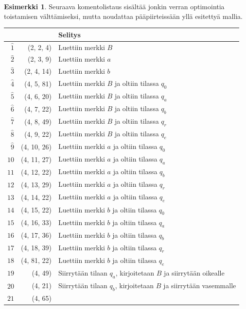 \documentclass[a4paper, 12pt]{article}
\theoremstyle{definition}
\newtheorem{example}[mydef]{Esimerkki}
\theoremstyle{plain}
\begin{document}
\begin{example}
Seuraava komentolistaus sisältää jonkin verran optimointia toistamisen välttämiseksi, mutta noudattaa pääpiirteissään yllä esitettyä mallia.
\\
\begin{center}
\begin{tabular}[t]{r|r|l}
& & Selitys\\
\hline
$\hat{1}$ & (2, 2, 4) & Luettiin merkki $B$ \\
$\hat{2}$ & (2, 3, 9) & Luettiin merkki $a$ \\
$\hat{3}$ & (2, 4, 14) & Luettiin merkki $b$ \\
$\hat{4}$ & (4, 5, 81) & Luettiin merkki $B$ ja oltiin tilassa $q_0$ \\
$\hat{5}$ & (4, 6, 20) & Luettiin merkki $B$ ja oltiin tilassa $q_a$ \\
$\hat{6}$ & (4, 7, 22) & Luettiin merkki $B$ ja oltiin tilassa $q_b$ \\
$\hat{7}$ & (4, 8, 49) & Luettiin merkki $B$ ja oltiin tilassa $q_r$ \\
$\hat{8}$ & (4, 9, 22) & Luettiin merkki $B$ ja oltiin tilassa $q_e$ \\
$\hat{9}$ & (4, 10, 26) & Luettiin merkki $a$ ja oltiin tilassa $q_0$ \\
$\hat{10}$ & (4, 11, 27) & Luettiin merkki $a$ ja oltiin tilassa $q_a$ \\
$\hat{11}$ & (4, 12, 22) & Luettiin merkki $a$ ja oltiin tilassa $q_b$ \\
$\hat{12}$ & (4, 13, 29) & Luettiin merkki $a$ ja oltiin tilassa $q_r$ \\
$\hat{13}$ & (4, 14, 22) & Luettiin merkki $a$ ja oltiin tilassa $q_e$ \\
$\hat{14}$ & (4, 15, 22) & Luettiin merkki $b$ ja oltiin tilassa $q_0$ \\
$\hat{15}$ & (4, 16, 33) & Luettiin merkki $b$ ja oltiin tilassa $q_a$ \\
$\hat{16}$ & (4, 17, 36) & Luettiin merkki $b$ ja oltiin tilassa $q_b$ \\
$\hat{17}$ & (4, 18, 39) & Luettiin merkki $b$ ja oltiin tilassa $q_r$ \\
$\hat{18}$ & (4, 81, 22) & Luettiin merkki $b$ ja oltiin tilassa $q_e$ \\
$\hat{19}$ & (4, 49) & Siirrytään tilaan $q_a$, kirjoitetaan $B$ ja siirrytään oikealle \\
$\hat{20}$ & (4, 21) & Siirrytään tilaan $q_b$, kirjoitetaan $B$ ja siirrytään vasemmalle \\
$\hat{21}$ & (4, 65) &  \\

\end{tabular}
\end{center}
\end{example}
\end{document}
